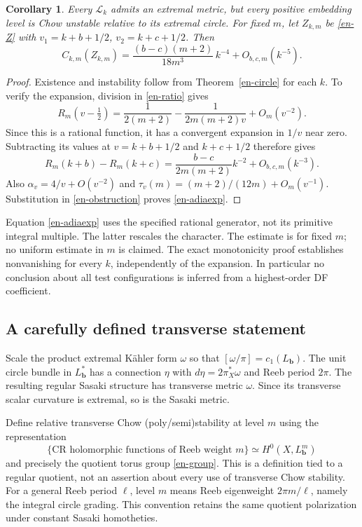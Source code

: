 \documentclass[12pt]{amsart}
\newtheorem{cor}[thm]{Corollary}
\theoremstyle{definition}
\theoremstyle{remark}
\numberwithin{equation}{section}
\begin{document}
\begin{cor}\label{en-adiaresult}
Every $\mathcal L_k$ admits an extremal metric, but every positive embedding level is Chow unstable relative to its extremal circle. For fixed $m$, let $Z_{k,m}$ be \eqref{en-Z} with $v_1=k+b+1/2$, $v_2=k+c+1/2$. Then
\begin{equation}\label{en-adiaexp}
 C_{k,m}(Z_{k,m})
 =\frac{(b-c)(m+2)}{18m^3}\,k^{-4}
   +O_{b,c,m}(k^{-5}).
\end{equation}
\end{cor}
\begin{proof}
Existence and instability follow from Theorem~\ref{en-circle} for each $k$. To verify the expansion, division in \eqref{en-ratio} gives
\[
 R_m(v-\tfrac12)=\frac1{2(m+2)}
 -\frac1{2m(m+2)v}+O_m(v^{-2}).
\]
Since this is a rational function, it has a convergent expansion in $1/v$ near zero. Subtracting its values at $v=k+b+1/2$ and $k+c+1/2$ therefore gives
\[
 R_m(k+b)-R_m(k+c)
 =\frac{b-c}{2m(m+2)}k^{-2}+O_{b,c,m}(k^{-3}).
\]
Also $\alpha_v=4/v+O(v^{-2})$ and
$\tau_v(m)=(m+2)/(12m)+O_m(v^{-1})$.
Substitution in \eqref{en-obstruction} proves \eqref{en-adiaexp}.
\end{proof}

Equation \eqref{en-adiaexp} uses the specified rational generator, not its primitive integral multiple. The latter rescales the character. The estimate is for fixed $m$; no uniform estimate in $m$ is claimed. The exact monotonicity proof establishes nonvanishing for every $k$, independently of the expansion. In particular no conclusion about all test configurations is inferred from a highest-order DF coefficient.

\subsection{A carefully defined transverse statement}
Scale the product extremal Kähler form $\omega$ so that $[\omega/\pi]=c_1(L_{\boldsymbol b})$. The unit circle bundle in $L_{\boldsymbol b}^*$ has a connection $\eta$ with $d\eta=2\pi_X^*\omega$ and Reeb period $2\pi$. The resulting regular Sasaki structure has transverse metric $\omega$. Since its transverse scalar curvature is extremal, so is the Sasaki metric.

Define relative transverse Chow (poly/semi)stability at level $m$ using the representation
\begin{equation}\label{en-CR}
 \{\text{CR holomorphic functions of Reeb weight }m\}
 \simeq H^0(X,L_{\boldsymbol b}^m)
\end{equation}
and precisely the quotient torus group \eqref{en-group}. This is a definition tied to a regular quotient, not an assertion about every use of transverse Chow stability. For a general Reeb period $\ell$, level $m$ means Reeb eigenweight $2\pi m/\ell$, namely the integral circle grading. This convention retains the same quotient polarization under constant Sasaki homotheties.
\end{document}
